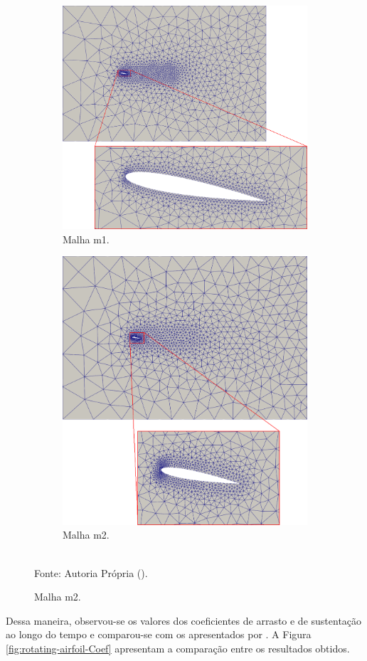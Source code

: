 \begin{figure}[h!]
    \centering
    \caption{Aerofólio com movimento de arfagem - Configuração inicial da malha.}
    \begin{subfigure}{\linewidth}
        \centering
        \includegraphics[width=.6\linewidth]{Figuras/rotating-airfoil/m1.png}
        \caption{Malha m1.}
    \end{subfigure}
    \begin{subfigure}{\linewidth}
        \centering
        \includegraphics[width=.6\linewidth]{Figuras/rotating-airfoil/m2.png}
        \caption{Malha m2.}
    \end{subfigure}
    \\Fonte: Autoria Própria (\the\year).
    \label{fig:rotating-airfoil}
\end{figure}

Dessa maneira, observou-se os valores dos coeficientes de arrasto e de sustentação ao longo do tempo e comparou-se com os apresentados por . A Figura \ref{fig:rotating-airfoil-Coef} apresentam a comparação entre os resultados obtidos.

